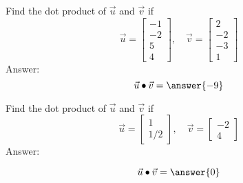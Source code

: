 \documentclass{ximera}
\author{Zack Reed}
\begin{document}
\begin{problem}\label{prob:dotproduct1}
  Find the dot product of $\vec{u}$ and $\vec{v}$ if
    $$\vec{u}=\begin{bmatrix}-1\\-2\\5\\4\end{bmatrix},\quad \vec{v}=\begin{bmatrix}2\\-2\\-3\\1\end{bmatrix}$$
    Answer:
    $$\vec{u} \dotp \vec{v} = \answer{-9}$$
  \end{problem}
   
  \begin{problem}\label{prob:dotproduct2}
  Find the dot product of $\vec{u}$ and $\vec{v}$ if
    $$\vec{u}=\begin{bmatrix}1\\1/2\end{bmatrix},\quad \vec{v}=\begin{bmatrix}-2\\4\end{bmatrix}$$
    Answer:
     
    $$\vec{u} \dotp \vec{v} = \answer{0}$$
  \end{problem}
   
\end{document}
